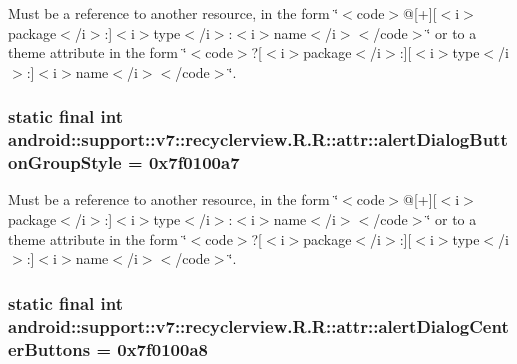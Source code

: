 Must be a reference to another resource, in the form \char`\"{}$<$code$>$@\mbox{[}+\mbox{]}\mbox{[}$<$i$>$package$<$/i$>$:\mbox{]}$<$i$>$type$<$/i$>$:$<$i$>$name$<$/i$>$$<$/code$>$\char`\"{} or to a theme attribute in the form \char`\"{}$<$code$>$?\mbox{[}$<$i$>$package$<$/i$>$:\mbox{]}\mbox{[}$<$i$>$type$<$/i$>$:\mbox{]}$<$i$>$name$<$/i$>$$<$/code$>$\char`\"{}. \hypertarget{classandroid_1_1support_1_1v7_1_1recyclerview_1_1_r_1_1attr_2bb21e180736d7bd7b2da946df834f03}{
\subsubsection[{alertDialogButtonGroupStyle}]{\setlength{\rightskip}{0pt plus 5cm}static final int android::support::v7::recyclerview.R.R::attr::alertDialogButtonGroupStyle = 0x7f0100a7}}
\label{classandroid_1_1support_1_1v7_1_1recyclerview_1_1_r_1_1attr_2bb21e180736d7bd7b2da946df834f03}


Must be a reference to another resource, in the form \char`\"{}$<$code$>$@\mbox{[}+\mbox{]}\mbox{[}$<$i$>$package$<$/i$>$:\mbox{]}$<$i$>$type$<$/i$>$:$<$i$>$name$<$/i$>$$<$/code$>$\char`\"{} or to a theme attribute in the form \char`\"{}$<$code$>$?\mbox{[}$<$i$>$package$<$/i$>$:\mbox{]}\mbox{[}$<$i$>$type$<$/i$>$:\mbox{]}$<$i$>$name$<$/i$>$$<$/code$>$\char`\"{}. \hypertarget{classandroid_1_1support_1_1v7_1_1recyclerview_1_1_r_1_1attr_172c1e2bca250a707f76e24e36b9e1a6}{
\subsubsection[{alertDialogCenterButtons}]{\setlength{\rightskip}{0pt plus 5cm}static final int android::support::v7::recyclerview.R.R::attr::alertDialogCenterButtons = 0x7f0100a8}}
\label{classandroid_1_1support_1_1v7_1_1recyclerview_1_1_r_1_1attr_172c1e2bca250a707f76e24e36b9e1a6}


